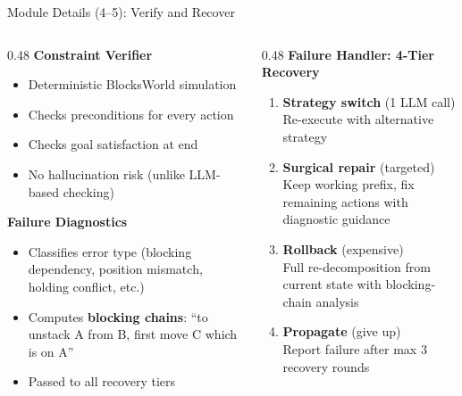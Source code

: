 \documentclass[aspectratio=169]{beamer}
\begin{document}
\begin{frame}{Module Details (4--5): Verify and Recover}

\begin{columns}[T]
\begin{column}{0.48\textwidth}
\textbf{Constraint Verifier}
\begin{itemize}
    \item Deterministic BlocksWorld simulation
    \item Checks preconditions for every action
    \item Checks goal satisfaction at end
    \item No hallucination risk (unlike LLM-based checking)
\end{itemize}

\vspace{0.2cm}
\textbf{Failure Diagnostics}
\begin{itemize}
    \item Classifies error type (blocking dependency, position mismatch, holding conflict, etc.)
    \item Computes \textbf{blocking chains}: ``to unstack A from B, first move C which is on A''
    \item Passed to all recovery tiers
\end{itemize}
\end{column}

\begin{column}{0.48\textwidth}
\textbf{Failure Handler: 4-Tier Recovery}

\vspace{0.2cm}
\begin{enumerate}
    \item \textcolor{successgreen}{\textbf{Strategy switch}} {\small (1 LLM call)} \\
    {\small Re-execute with alternative strategy}

    \vspace{0.15cm}
    \item \textcolor{mainblue}{\textbf{Surgical repair}} {\small (targeted)} \\
    {\small Keep working prefix, fix remaining actions with diagnostic guidance}

    \vspace{0.15cm}
    \item \textcolor{warnorange}{\textbf{Rollback}} {\small (expensive)} \\
    {\small Full re-decomposition from current state with blocking-chain analysis}

    \vspace{0.15cm}
    \item \textcolor{alertred}{\textbf{Propagate}} {\small (give up)} \\
    {\small Report failure after max 3 recovery rounds}
\end{enumerate}
\end{column}
\end{columns}

\end{frame}
\end{document}
